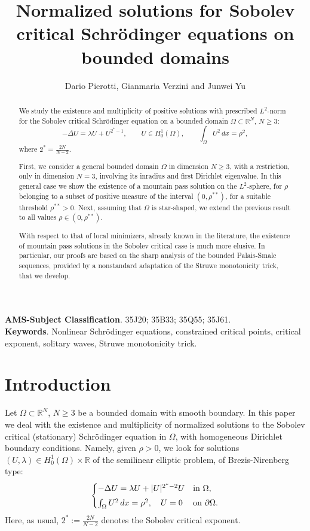 \documentclass[10pt]{article}
\title{Normalized solutions for Sobolev critical Schr\"{o}dinger equations on bounded domains}
\author{Dario Pierotti, Gianmaria Verzini and Junwei Yu}
\newcommand{\R}{\mathbb{R}}
\theoremstyle{definition}
\numberwithin{equation}{section}
\begin{document}
\maketitle



\begin{abstract}
We study the existence and multiplicity of positive solutions with prescribed $L^2$-norm for 
the Sobolev critical Schr\"odinger equation on a bounded domain $\Omega\subset\mathbb{R}^N$, $N\ge3$: 
\[
-\Delta U = \lambda U + U^{2^{*}-1},\qquad U\in H^1_0(\Omega),\qquad
\int_\Omega U^2\,dx = \rho^{2},
\]
where $2^*=\frac{2N}{N-2}$.

First, we consider a general bounded domain $\Omega$ in dimension $N\ge3$, with a restriction, only 
in dimension $N=3$, involving its inradius and first Dirichlet eigenvalue. In this general case 
we show the existence of a mountain pass solution on the $L^2$-sphere, for $\rho$ belonging to a 
subset of positive measure of the interval $(0,\rho^{**})$, for a suitable threshold $\rho^{**}>0$. 
Next, assuming that $\Omega$ is star-shaped, we extend the previous result to all values  
$\rho\in(0,\rho^{**})$. 

With respect to that of local minimizers, already known in the literature, the existence of mountain 
pass solutions in the Sobolev critical case is much more elusive. In particular, our proofs are based 
on the sharp analysis of the bounded Palais-Smale sequences, provided by a nonstandard adaptation of the Struwe monotonicity trick, that we develop.
\end{abstract}
\noindent
{\footnotesize \textbf{AMS-Subject Classification}}.
{\footnotesize 35J20; 35B33; 35Q55; 35J61.}\\
{\footnotesize \textbf{Keywords}}.
{\footnotesize Nonlinear Schr\"odinger equations, constrained critical points, critical exponent, solitary waves, Struwe monotonicity trick.}

\section{Introduction}

Let $\Omega\subset\R^N$, $N\ge3$ be a bounded domain with smooth boundary. 
In this paper we deal with the existence and multiplicity of normalized 
solutions to the Sobolev critical (stationary) Schr\"odinger equation in 
$\Omega$, with homogeneous Dirichlet boundary conditions. Namely, given $\rho>0$, 
we look for solutions $(U,\lambda)\in H^1_0(\Omega)\times \R$ of the semilinear 
elliptic problem, of Brezis-Nirenberg type:
%
\begin{equation}\label{eq:main}
\begin{cases}
-\Delta U = \lambda U + |U|^{2^{*}-2}U  & \text{in }\Omega,\smallskip\\
\int_\Omega U^2\,dx = \rho^{2}, \quad U=0  & \text{on }\partial\Omega.
\end{cases}
\end{equation}
Here, as usual, $2^{*}:=\frac{2N}{N-2}$ denotes the Sobolev critical exponent. 
\end{document}
